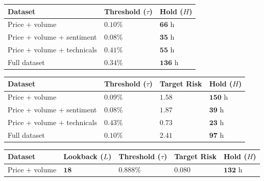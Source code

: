 \begin{table}[htbp]
	\centering
	\renewcommand{\arraystretch}{1.1}
	\scriptsize
	\begin{minipage}[t]{0.48\textwidth}
		\centering
			\begin{tabular}{|p{3.4cm}|p{1.8cm}|p{1.5cm}|}
			\hline
				Dataset & \textbf{Threshold ($\tau$)} & \textbf{Hold ($H$)} \\
			\hline
				Price + volume & $\mathbf{0.10\%}$ & $\mathbf{66}$ h \\
			\hline
				Price + volume + sentiment & $\mathbf{0.08\%}$ & $\mathbf{35}$ h \\
			\hline
				Price + volume + technicals & $\mathbf{0.41\%}$ & $\mathbf{55}$ h \\
			\hline
				Full dataset & $\mathbf{0.34\%}$ & $\mathbf{136}$ h \\
			\hline
			\end{tabular}
	\end{minipage}
	\hfill
	\begin{minipage}[t]{0.48\textwidth}
		\centering
			\begin{tabular}{|p{3.0cm}|p{1.5cm}|p{1.3cm}|p{1.1cm}|}
			\hline
				Dataset & \textbf{Threshold ($\tau$)} & \textbf{Target Risk} & \textbf{Hold ($H$)} \\
			\hline
				Price + volume & $\mathbf{0.09\%}$ & $\mathbf{1.58}$ & $\mathbf{150}$ h \\
			\hline
				Price + volume + sentiment & $\mathbf{0.08\%}$ & $\mathbf{1.87}$ & $\mathbf{39}$ h \\
			\hline
				Price + volume + technicals & $\mathbf{0.43\%}$ & $\mathbf{0.73}$ & $\mathbf{23}$ h \\
			\hline
				Full dataset & $\mathbf{0.10\%}$ & $\mathbf{2.41}$ & $\mathbf{97}$ h \\
			\hline
			\end{tabular}
	\end{minipage}
	\par\vspace{0.6em}
	\begin{minipage}[t]{0.7\textwidth}
		\centering
			\begin{tabular}{|p{3.4cm}|p{1.5cm}|p{1.6cm}|p{1.4cm}|p{1.2cm}|}
			\hline
				Dataset & \textbf{Lookback ($L$)} & \textbf{Threshold ($\tau$)} & \textbf{Target Risk} & \textbf{Hold ($H$)} \\
			\hline
				Price + volume & $\mathbf{18}$ & $\mathbf{0.888\%}$ & $\mathbf{0.080}$ & $\mathbf{132}$ h \\

\end{tabular}
\end{minipage}
\end{table}
